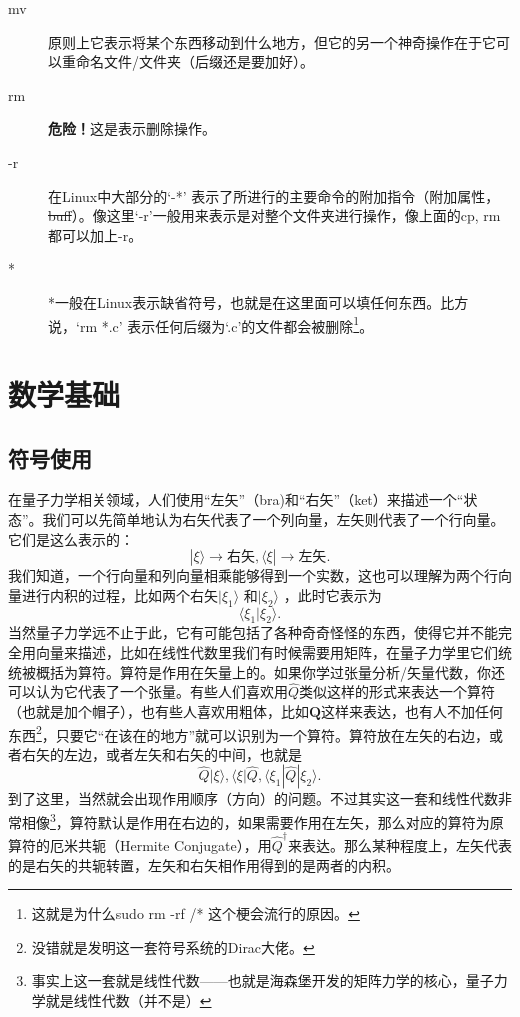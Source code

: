 \documentclass{article}
\numberwithin{equation}{section}
\begin{document}
\begin{description}
    \item[mv] 原则上它表示将某个东西移动到什么地方，但它的另一个神奇操作在于它可以重命名文件/文件夹（后缀还是要加好）。

    \item[rm] \textbf{ 危险！}这是表示删除操作。

    \item[-r] 在Linux中大部分的`-*' 表示了所进行的主要命令的附加指令（附加属性，\sout{buff}）。像这里`-r'一般用来表示是对整个文件夹进行操作，像上面的cp, rm 都可以加上-r。

    \item[*] *一般在Linux表示缺省符号，也就是在这里面可以填任何东西。比方说，`rm *.c' 表示任何后缀为`.c'的文件都会被删除\footnote{这就是为什么sudo rm -rf /* 这个梗会流行的原因。}。

  \end{description}

    \section{数学基础}
    \subsection{符号使用}
    在量子力学相关领域，人们使用``左矢''（bra)和``右矢''（ket）来描述一个``状态''。我们可以先简单地认为右矢代表了一个列向量，左矢则代表了一个行向量。它们是这么表示的：
    \[
    | \xi \rangle \rightarrow \text{右矢}, \langle \xi | \rightarrow \text{左矢}    
    .\]  
    我们知道，一个行向量和列向量相乘能够得到一个实数，这也可以理解为两个行向量进行内积的过程，比如两个右矢$| \xi_1 \rangle $ 和$| \xi_2 \rangle $ ，此时它表示为
    \[
    \langle \xi_1 | \xi_2 \rangle 
    .\] 
    当然量子力学远不止于此，它有可能包括了各种奇奇怪怪的东西，使得它并不能完全用向量来描述，比如在线性代数里我们有时候需要用矩阵，在量子力学里它们统统被概括为算符。算符是作用在矢量上的。如果你学过张量分析/矢量代数，你还可以认为它代表了一个张量。有些人们喜欢用$\hat{Q}$类似这样的形式来表达一个算符（也就是加个帽子），也有些人喜欢用粗体，比如$\mathbf{Q}$这样来表达，也有人不加任何东西\footnote{没错就是发明这一套符号系统的\Large{Dirac}大佬。}，只要它``在该在的地方''就可以识别为一个算符。算符放在左矢的右边，或者右矢的左边，或者左矢和右矢的中间，也就是
    \[
    \hat{Q}| \xi \rangle ,\langle \xi | \hat{Q}, \langle \xi_1 | \hat{Q} | \xi_2 \rangle   
    .\] 
    到了这里，当然就会出现作用顺序（方向）的问题。不过其实这一套和线性代数非常相像\footnote{事实上这一套就是线性代数——也就是海森堡开发的矩阵力学的核心，量子力学就是线性代数（并不是）}，算符默认是作用在右边的，如果需要作用在左矢，那么对应的算符为原算符的厄米共轭（Hermite Conjugate），用$\hat{Q}^\dagger$来表达。那么某种程度上，左矢代表的是右矢的共轭转置，左矢和右矢相作用得到的是两者的内积。
\end{document}

